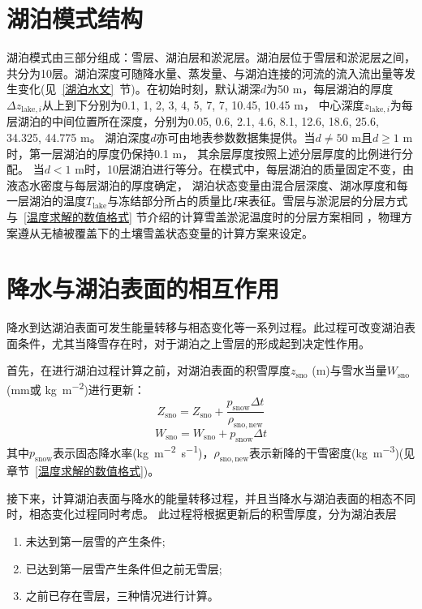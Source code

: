 \section{湖泊模式结构}
湖泊模式由三部分组成：雪层、湖泊层和淤泥层。湖泊层位于雪层和淤泥层之间，
共分为10层。湖泊深度可随降水量、蒸发量、与湖泊连接的河流的流入流出量等发生变化(见~\ref{湖泊水文}~节)。在初始时刻，默认湖深$d$为50 m，每层湖泊的厚度$\Delta z_{\mathrm{lake},i}$从上到下分别为0.1, 1, 2, 3, 4, 5, 7, 7, 10.45, 10.45 m，
中心深度$z_{\mathrm{lake},i}$为每层湖泊的中间位置所在深度，分别为0.05, 0.6, 2.1, 4.6, 8.1, 12.6, 18.6, 25.6, 34.325, 44.775 m。
湖泊深度$d$亦可由地表参数数据集提供。当$d\neq50$ m且$d\geqslant 1$ m时，第一层湖泊的厚度仍保持0.1 m，
其余层厚度按照上述分层厚度的比例进行分配。
当$d<1$ m时，10层湖泊进行等分。在模式中，每层湖泊的质量固定不变，由液态水密度与每层湖泊的厚度确定，
湖泊状态变量由混合层深度、湖冰厚度和每一层湖泊的温度$T_{\mathrm{lake}}$与冻结部分所占的质量比$I$来表征。雪层与淤泥层的分层方式与~\ref{温度求解的数值格式} 节介绍的计算雪盖淤泥温度时的分层方案相同
，物理方案遵从无植被覆盖下的土壤雪盖状态变量的计算方案来设定。


\section{降水与湖泊表面的相互作用}
降水到达湖泊表面可发生能量转移与相态变化等一系列过程。此过程可改变湖泊表面条件，尤其当降雪存在时，对于湖泊之上雪层的形成起到决定性作用。


首先，在进行湖泊过程计算之前，对湖泊表面的积雪厚度$z_{\mathrm{sno}}$ (m)与雪水当量$W_{\mathrm{sno}}$ (mm或 \unit{kg.m^{-2}})进行更新：
\begin{equation}
  Z_{\mathrm{sno}}=Z_{\mathrm{sno}}+\frac{p_{\mathrm {snow}} \Delta t}{\rho_{\mathrm{sno,new}}}
\end{equation}
\begin{equation}
  W_{\mathrm{sno}}=W_{\mathrm{sno}}+p_{\mathrm {snow}} \Delta t
\end{equation}
其中$p_{\mathrm {snow}} $表示固态降水率(\unit{kg.m^{-2}.s^{-1}})，$\rho_{\mathrm{sno,new}}$表示新降的干雪密度(\unit{kg.m^{-3}})(见章节~\ref{温度求解的数值格式})。

接下来，计算湖泊表面与降水的能量转移过程，并且当降水与湖泊表面的相态不同时，相态变化过程同时考虑。
此过程将根据更新后的积雪厚度，分为湖泊表层
\begin{enumerate}
  \item 未达到第一层雪的产生条件;
  \item 已达到第一层雪产生条件但之前无雪层;
  \item 之前已存在雪层，三种情况进行计算。
\end{enumerate}


